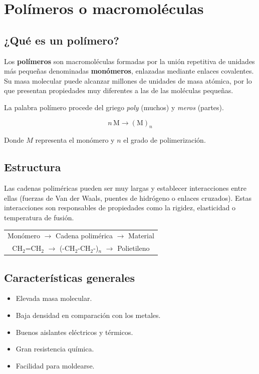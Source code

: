 \vspace*{20pt}

\section{Polímeros o macromoléculas}

\subsection{¿Qué es un polímero?}

Los \textbf{polímeros} son macromoléculas formadas por la unión repetitiva de unidades
más pequeñas denominadas \textbf{monómeros}, enlazadas mediante enlaces covalentes.
Su masa molecular puede alcanzar millones de unidades de masa atómica, por lo que
presentan propiedades muy diferentes a las de las moléculas pequeñas.

La palabra polímero procede del griego \emph{poly} (muchos) y \emph{meros} (partes).

\begin{center}
\[
n\,\mathrm{M}\longrightarrow (\mathrm{M})_n
\]
\end{center}

Donde $M$ representa el monómero y $n$ el grado de polimerización.

\subsection{Estructura}

Las cadenas poliméricas pueden ser muy largas y establecer interacciones entre ellas
(fuerzas de Van der Waals, puentes de hidrógeno o enlaces cruzados). Estas
interacciones son responsables de propiedades como la rigidez, elasticidad o
temperatura de fusión.

\begin{center}
\begin{tabular}{c}
Monómero $\rightarrow$ Cadena polimérica $\rightarrow$ Material\\
CH$_2$=CH$_2$ $\rightarrow$ (-CH$_2$-CH$_2$-)$_n$ $\rightarrow$ Polietileno
\end{tabular}
\end{center}

\subsection{Características generales}

\begin{itemize}
\item Elevada masa molecular.
\item Baja densidad en comparación con los metales.
\item Buenos aislantes eléctricos y térmicos.
\item Gran resistencia química.
\item Facilidad para moldearse.
\end{itemize}

